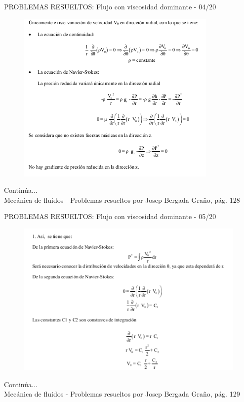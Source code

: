 \begin{frame}{PROBLEMAS RESUELTOS: Flujo con viscosidad dominante - 04/20}
\justifying
\begin{figure}[H]
\centering
\includegraphics[scale=0.5]{Section_Files/S2-imagenes-Jhon/Book-ProbResuelts/P35-E04.png}
\end{figure}
Continúa...\\
{\tiny Mecánica de fluidos - Problemas resueltos por Josep Bergada Graño, pág. 128}
\end{frame}

\begin{frame}{PROBLEMAS RESUELTOS: Flujo con viscosidad dominante - 05/20}
\justifying
\begin{figure}[H]
\centering
\includegraphics[scale=0.5]{Section_Files/S2-imagenes-Jhon/Book-ProbResuelts/P35-E05.png}
\end{figure}
Continúa...\\
{\tiny Mecánica de fluidos - Problemas resueltos por Josep Bergada Graño, pág. 129}
\end{frame}

